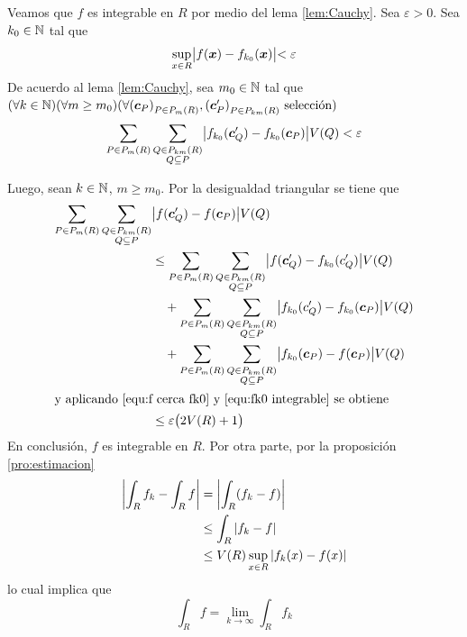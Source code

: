 \begin{demostracion}
Veamos que $ f $ es integrable en $ R $ por medio del lema \ref{lem:Cauchy}. Sea $ \varepsilon > 0 $. Sea $k_0\in \mathbb{N}$ tal que
\begin{equation}\label{equ:f cerca fk0}
    \sup_{x \in R} \bigr\lvert f(\boldsymbol{x}) - f_{k_0}(\boldsymbol{x}) \bigl\rvert < \varepsilon 
\end{equation}
De acuerdo al lema \ref{lem:Cauchy}, sea $m_0\in \mathbb{N}$ tal que 
\\$( \forall k\in \mathbb{N})( \forall m \geq m_0 ) ( \forall
{(\boldsymbol{c}_P)}_{P \in P_{m}(R)},{(\boldsymbol{c}'_P)}_{P \in
P_{km}(R)} \allowbreak \text{ selecci\'on} ) $
\begin{equation}\label{equ:fk0 integrable}
    \sum_{P \in P_{m}(R)} \sum_{\substack{Q \in P_{km}(R) \\ Q \subseteq P}}
        \bigr\lvert f_{k_0}(\boldsymbol{c}'_Q)-f_{k_0}(\boldsymbol{c}_P) \bigl\rvert V(Q) < \varepsilon 
\end{equation}

Luego, sean $k\in \mathbb{N}$, $ m \geq m_0 $. Por la desigualdad
triangular se tiene que
\begin{align*}
\sum_{P \in P_{m}(R)} \sum_{\substack{Q \in P_{km}(R) \\ Q
\subseteq P}}
        &\bigr\lvert f(\boldsymbol{c}'_Q)-f(\boldsymbol{c}_P) \bigl\rvert V(Q)\\
        &\leq \sum_{P \in P_{m}(R)} \sum_{\substack{Q \in P_{km}(R) \\ Q \subseteq
        P}}  \bigr\lvert f(\boldsymbol{c}'_Q)-f_{k_0}(c'_Q) \bigl\rvert V(Q) \\
    &\quad + \sum_{P \in P_{m}(R)} \sum_{\substack{Q \in P_{km}(R) \\ Q \subseteq
        P}} \bigr\lvert f_{k_0}(c'_Q)-f_{k_0}(\boldsymbol{c}_P) \bigl\rvert V(Q) \\
    &\quad + \sum_{P \in P_{m}(R)} \sum_{\substack{Q \in P_{km}(R) \\ Q \subseteq
        P}} \bigr\lvert f_{k_0}(\boldsymbol{c}_P)-f(\boldsymbol{c}_P) \bigl\rvert V(Q) \\
\intertext{y aplicando \ref{equ:f cerca fk0} y \ref{equ:fk0
integrable} se obtiene}
    &\leq \varepsilon \bigl( 2 V(R) + 1 \bigr)
\end{align*}
En conclusi\'on, $ f $ es integrable en $ R $. Por otra parte, por la proposici\'on \ref{pro:estimacion}
\begin{align*}
    \left\lvert \int_R f_k - \int_R f \right\rvert
        &= \left\lvert \int_R (f_k - f) \right\rvert \\
        &\leq \int_R \left\lvert f_k - f\right\rvert \\
        &\leq V(R) \sup_{x \in R} \left\lvert f_k(x) - f(x) \right\rvert
\end{align*}
lo cual implica que
    \[ \int_R f = \lim_{k \to \infty} \int_R f_k \]
\end{demostracion}

